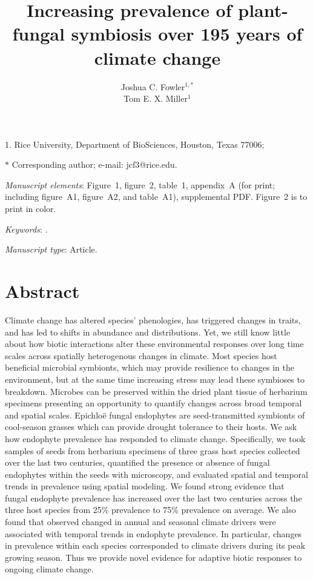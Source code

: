 \documentclass[11pt]{article}
\title{Increasing prevalence of plant-fungal symbiosis over 195 years of climate change}
\author{Joshua C. Fowler$^{1,\ast}$ \\
	Tom E. X. Miller$^{1}$}
\date{}
\begin{document}
	
	\maketitle
	
	\noindent{} 1. Rice University, Department of BioSciences, Houston, Texas 77006;


	\noindent{} $\ast$ Corresponding author; e-mail: jcf3@rice.edu.
	
	\bigskip
	
	\textit{Manuscript elements}: Figure~1, figure~2, table~1, appendix~A (for print; including figure~A1, figure~A2, and table~A1), supplemental PDF. Figure~2 is to print in color.
	
	\bigskip
	
	\textit{Keywords}: .
	
	\bigskip
	
	\textit{Manuscript type}: Article. %
	
	\bigskip
	
	
	
	\newpage{}
	
	\section*{Abstract}
Climate change has altered species’ phenologies, has triggered changes in traits, and has led to shifts in abundance and distributions. 
Yet, we still know little about how biotic interactions alter these environmental responses over long time scales across spatially heterogenous changes in climate. 
Most species host beneficial microbial symbionts, which may provide resilience to changes in the environment, but at the same time increasing stress may lead these symbioses to breakdown. 
Microbes can be preserved within the dried plant tissue of herbarium specimens presenting an opportunity to quantify changes across broad temporal and spatial scales. 
Epichloë fungal endophytes are seed-transmitted symbionts of cool-season grasses which can provide drought tolerance to their hosts. 
 We ask how endophyte prevalence has responded to climate change. 
 Specifically, we took samples of seeds from herbarium specimens of three grass host species collected over the last two centuries, quantified the presence or absence of fungal endophytes within the seeds with microscopy, and evaluated spatial and temporal trends in prevalence using spatial modeling.
 We found strong evidence that fungal endophyte prevalence has increased over the last two centuries across the three host species from 25\% prevalence to 75\% prevalence on average.
We also found that observed changed in annual  and seasonal climate drivers were associated with temporal trends in endophyte prevalence. 
In particular, changes in prevalence within each species corresponded to climate drivers during its peak growing season. 
Thus we provide novel evidence for adaptive biotic responses to ongoing climate change.
\end{document}
